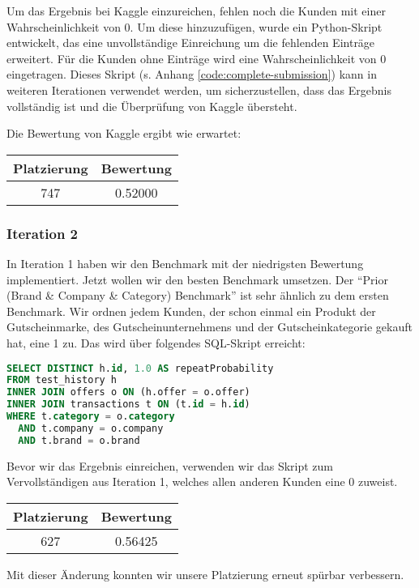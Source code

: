 Um das Ergebnis bei Kaggle einzureichen, fehlen noch die Kunden mit einer Wahrscheinlichkeit von 0.
Um diese hinzuzufügen, wurde ein Python-Skript entwickelt, das eine unvollständige Einreichung
um die fehlenden Einträge erweitert. Für die Kunden ohne Einträge wird eine Wahrscheinlichkeit von 0 eingetragen.
Dieses Skript (s. Anhang \ref{code:complete-submission}) kann in weiteren Iterationen verwendet werden,
um sicherzustellen, dass das Ergebnis vollständig ist und die Überprüfung von Kaggle übersteht. 

Die Bewertung von Kaggle ergibt wie erwartet:

\begin{tabular}{|c|c|}
	\hline \textbf{Platzierung} & \textbf{Bewertung} \\ 
	\hline 747 & 0.52000  \\ 
	\hline 
\end{tabular}

\subsubsection{Iteration 2}

In Iteration 1 haben wir den Benchmark mit der niedrigsten Bewertung implementiert. Jetzt wollen wir 
den besten Benchmark umsetzen. Der "`Prior (Brand \& Company \& Category) Benchmark"' ist sehr ähnlich
zu dem ersten Benchmark. Wir ordnen jedem Kunden, der schon einmal ein Produkt der Gutscheinmarke,
des Gutscheinunternehmens und der Gutscheinkategorie gekauft hat, eine 1 zu. 
Das wird über folgendes SQL-Skript erreicht:

\begin{lstlisting}[language=SQL]
SELECT DISTINCT h.id, 1.0 AS repeatProbability
FROM test_history h 
INNER JOIN offers o ON (h.offer = o.offer)
INNER JOIN transactions t ON (t.id = h.id)
WHERE t.category = o.category
  AND t.company = o.company
  AND t.brand = o.brand
\end{lstlisting}

Bevor wir das Ergebnis einreichen, verwenden wir das Skript zum Vervollständigen aus Iteration 1, welches allen anderen Kunden eine 0 zuweist.

\begin{tabular}{|c|c|}
	\hline \textbf{Platzierung} & \textbf{Bewertung} \\ 
	\hline 627 & 0.56425  \\ 
	\hline 
\end{tabular}

Mit dieser Änderung konnten wir unsere Platzierung erneut spürbar verbessern.

